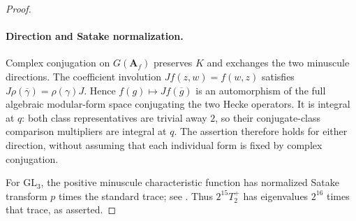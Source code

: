 \begin{proof}
\paragraph{Direction and Satake normalization.}
Complex conjugation on $G(\mathbf A_f)$ preserves $K$ and exchanges
the two minuscule directions. The coefficient involution
$Jf(z,w)=f(w,z)$ satisfies
$J\rho(\overline\gamma)=\rho(\gamma)J$.
Hence $f(g)\mapsto J f(\overline g)$ is an automorphism of the
full algebraic modular-form space conjugating the two Hecke
operators. It is integral at $q$: both class representatives are
trivial away $2$, so their conjugate-class comparison multipliers
are integral at $q$. The assertion therefore holds for either
direction, without assuming that each individual form is fixed
by complex conjugation.

For $\mathrm{GL}_3$, the positive minuscule characteristic function
has normalized Satake transform $p$ times the standard trace;
see \cite[\S3, (3.13)--(3.14)]{K17GrossSatake1998}.
Thus $2^{15}T_2^+$ has eigenvalues $2^{16}$ times that trace,
as asserted.
\end{proof}
